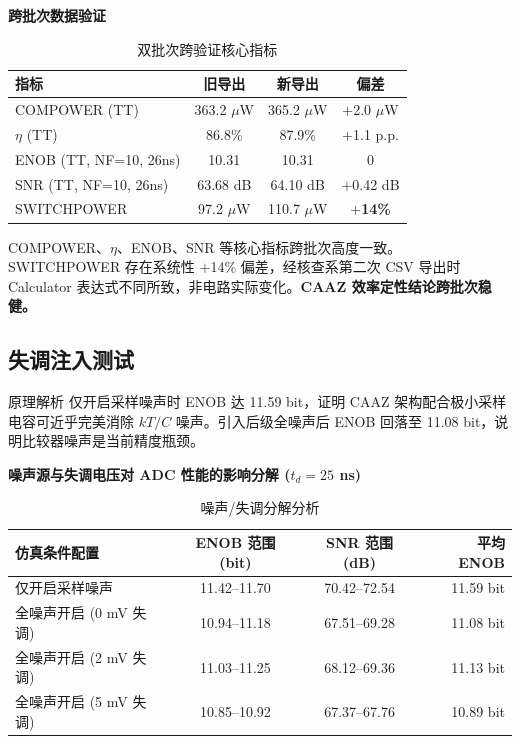 \documentclass[11pt,a4paper,UTF8]{ctexart}
\begin{document}
\textbf{跨批次数据验证}

\begin{table}[htbp]\centering\caption{双批次跨验证核心指标}\label{tab:cross2}\small
\begin{tabular}{lccc}\toprule
\textbf{指标} & \textbf{旧导出} & \textbf{新导出} & \textbf{偏差} \\\midrule
COMPOWER (TT) & 363.2 $\mu$W & 365.2 $\mu$W & $+$2.0 $\mu$W \\
$\eta$ (TT) & 86.8\% & 87.9\% & $+$1.1 p.p. \\
ENOB (TT, NF=10, 26ns) & 10.31 & 10.31 & 0 \\
SNR (TT, NF=10, 26ns) & 63.68 dB & 64.10 dB & $+$0.42 dB \\
SWITCHPOWER & 97.2 $\mu$W & 110.7 $\mu$W & \textbf{$+$14\%} \\\bottomrule
\end{tabular}
\end{table}

COMPOWER、$\eta$、ENOB、SNR 等核心指标跨批次高度一致。SWITCHPOWER 存在系统性 $+$14\% 偏差，经核查系第二次 CSV 导出时 Calculator 表达式不同所致，非电路实际变化。\textbf{CAAZ 效率定性结论跨批次稳健。}

\subsection{失调注入测试}

\begin{prinbox}{原理解析}
仅开启采样噪声时 ENOB 达 11.59 bit，证明 CAAZ 架构配合极小采样电容可近乎完美消除 $kT/C$ 噪声。引入后级全噪声后 ENOB 回落至 11.08 bit，说明比较器噪声是当前精度瓶颈。
\end{prinbox}

\textbf{噪声源与失调电压对 ADC 性能的影响分解 ($t_d = 25$ ns)}

\begin{table}[htbp]\centering\caption{噪声/失调分解分析}\label{tab:offset}\small
\begin{tabular}{lccr}\toprule
\textbf{仿真条件配置} & \textbf{ENOB 范围 (bit)} & \textbf{SNR 范围 (dB)} & \textbf{平均 ENOB} \\\midrule
仅开启采样噪声 & 11.42--11.70 & 70.42--72.54 & 11.59 bit \\
全噪声开启 (0 mV 失调) & 10.94--11.18 & 67.51--69.28 & 11.08 bit \\
全噪声开启 (2 mV 失调) & 11.03--11.25 & 68.12--69.36 & 11.13 bit \\
全噪声开启 (5 mV 失调) & 10.85--10.92 & 67.37--67.76 & 10.89 bit \\\bottomrule
\end{tabular}
\end{table}
\end{document}
